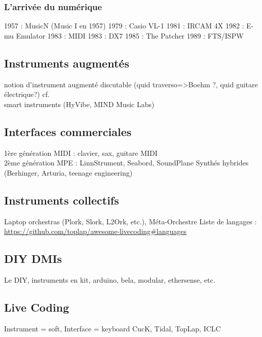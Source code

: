\subsubsection{L'arrivée du numérique}

1957 : MusicN (Music I en 1957)
1979 : Casio VL-1
1981 : IRCAM 4X
1982 : E-mu Emulator
1983 : MIDI
1983 : DX7
1985 : The Patcher
1989 : FTS/ISPW

\subsection{Instruments augmentés}
notion d'instrument augmenté discutable (quid traverso=>Boehm ?, quid guitare électrique?) cf. \href{{sec:ephemeral:longevity_stability}}\\
smart instruments (HyVibe, MIND Music Labs)

\subsection{Interfaces commerciales}
1ère génération MIDI : clavier, sax, guitare MIDI\\
2ème génération MPE :  LinnStrument, Seabord, SoundPlane
Synthés hybrides (Berhinger, Arturia, teenage engineering)
\subsection{Instruments collectifs}
Laptop orchestras (Plork, Slork, L2Ork, etc.), Méta-Orchestre
Liste de langages : \url{https://github.com/toplap/awesome-livecoding#languages}

\subsection{DIY DMIs}
Le \gls{DIY}, instruments en kit, arduino, bela, modular, ethersense, etc.

\subsection{Live Coding}
Instrument = soft, Interface = keyboard
CucK, Tidal, TopLap, \gls{ICLC}

